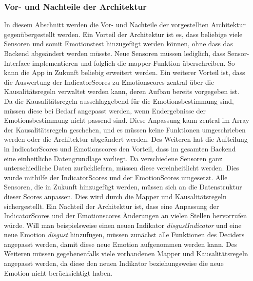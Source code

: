 \subsubsection{Vor- und Nachteile der Architektur} 
In diesem Abschnitt werden die Vor- und Nachteile der vorgestellten Architektur gegenübergestellt werden. \newline
Ein Vorteil der Architektur ist es, dass beliebige viele Sensoren und somit Emotionstest hinzugefügt werden können, ohne dass das Backend abgeändert werden müsste. Neue Sensoren müssen lediglich, dass Sensor-Interface implementieren und folglich die mapper-Funktion überschreiben. So kann die App in Zukunft beliebig erweitert werden. \newline
Ein weiterer Vorteil ist, dass die Auswertung der IndicatorScores zu Emotionscores zentral über die Kausalitätsregeln verwaltet werden kann, deren Aufbau bereits vorgegeben ist. Da die Kausalitätsregeln ausschlaggebend für die Emotionsbestimmung sind, müssen diese bei Bedarf angepasst werden, wenn Endergebnisse der Emotionsbestimmung nicht passend sind. Diese Anpassung kann zentral im Array der Kausalitätsregeln geschehen, und es müssen keine Funktionen umgeschrieben werden oder die Architektur abgeändert werden. \newline
Des Weiteren hat die Aufteilung in IndicatorScores und Emotionscores den Vorteil, dass im gesamten Backend eine einheitliche Datengrundlage vorliegt. Da verschiedene Sensoren ganz unterschiedliche Daten zurückliefern, müssen diese vereinheitlicht werden. Dies wurde mithilfe der IndicatorScores und der EmotionScores umgesetzt. Alle Sensoren, die in Zukunft hinzugefügt werden, müssen sich an die Datenstruktur dieser Scores anpassen. Dies wird durch die Mapper und Kausalitätsregeln sichergestellt. \newline
\newline
Ein Nachteil der Architektur ist, dass eine Anpassung der IndicatorScores und der Emotionscores Änderungen an vielen Stellen hervorrufen würde. Will man beispielsweise einen neuen Indikator \textit{disgustIndicator} und eine neue Emotion \textit{disgust} hinzufügen, müssen zunächst alle Funktionen des Deciders angepasst werden, damit diese neue Emotion aufgenommen werden kann. Des Weiteren müssen gegebenenfalls viele vorhandenen Mapper und Kausalitätsregeln angepasst werden, da diese den neuen Indikator beziehungsweise die neue Emotion nicht berücksichtigt haben.
